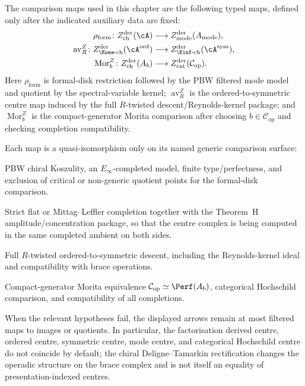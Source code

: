 \begin{construction}
\label{constr:presentation-centre-comparison-maps}
The comparison maps used in this chapter are the following typed maps,
defined only after the indicated auxiliary data are fixed:
\begin{align}
\rho_{\mathrm{form}}\colon
 Z^{\mathrm{der}}_{\mathrm{ch}}(\cA)
 &\longrightarrow
 Z^{\mathrm{der}}_{\mathrm{mode}}(A_{\mathrm{mode}}),
\label{eq:presentation-centre-formal-map}\\
\operatorname{av}_{R}^{Z}\colon
 Z^{\mathrm{der}}_{\Eone\text{-}\mathrm{ch}}(\cA^{\mathrm{ord}})
 &\longrightarrow
 Z^{\mathrm{der}}_{\Einf\text{-}\mathrm{ch}}(\cA^{\mathrm{sym}}),
\label{eq:presentation-centre-averaging-map}\\
\operatorname{Mor}_{b}^{Z}\colon
 Z^{\mathrm{der}}_{\mathrm{ch}}(A_b)
 &\longrightarrow
 Z^{\mathrm{der}}_{\mathrm{cat}}(\mathcal C_{\mathrm{op}}).
\label{eq:presentation-centre-morita-map}
\end{align}
Here \(\rho_{\mathrm{form}}\) is formal-disk restriction followed by
the PBW filtered mode model and quotient by the spectral-variable
kernel; \(\operatorname{av}_{R}^{Z}\) is the ordered-to-symmetric
centre map induced by the full \(R\)-twisted descent/Reynolds-kernel
package; and \(\operatorname{Mor}_{b}^{Z}\) is the compact-generator
Morita comparison after choosing \(b\in\mathcal C_{\mathrm{op}}\) and
checking completion compatibility.

Each map is a quasi-isomorphism only on its named generic comparison
surface:
\begin{description}[leftmargin=2.0em, style=nextline]
\item[H1.]
PBW chiral Koszulity, an \(E_\infty\)-completed model, finite
type/perfectness, and exclusion of critical or non-generic quotient
points for the formal-disk comparison.
\item[H2.]
Strict flat or Mittag--Leffler completion together with the Theorem~H
amplitude/concentration package, so that the centre complex is being
computed in the same completed ambient on both sides.
\item[H3.]
Full \(R\)-twisted ordered-to-symmetric descent, including the
Reynolds-kernel ideal and compatibility with brace operations.
\item[H4.]
Compact-generator Morita equivalence
\(\mathcal C_{\mathrm{op}}\simeq\Perf(A_b)\), categorical Hochschild
comparison, and compatibility of all completions.
\end{description}
When the relevant hypotheses fail, the displayed arrows remain at
most filtered maps to images or quotients.  In particular, the
factorisation derived centre, ordered centre, symmetric centre, mode
centre, and categorical Hochschild centre do not coincide by default;
the chiral Deligne--Tamarkin rectification changes the operadic
structure on the brace complex and is not itself an equality of
presentation-indexed centres.
\end{construction}

